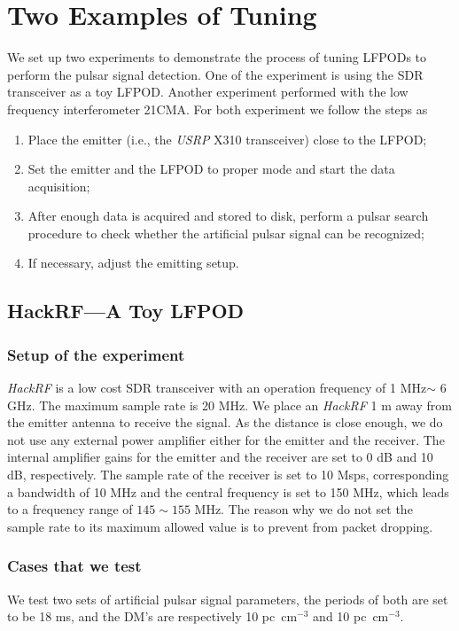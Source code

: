 \documentclass[fleqn,usenatbib]{mnras}
\begin{document}
\section{Two Examples of Tuning}
We set up two experiments to demonstrate the process of tuning LFPODs to perform the pulsar signal detection. 
One of the experiment is using the SDR transceiver as a toy LFPOD.
Another experiment performed with the low frequency interferometer 21CMA.
For both experiment we follow the steps as
\begin{enumerate}
    \item Place the emitter (i.e., the \textit{USRP} X310 transceiver) close to the LFPOD;
    \item Set the emitter and the LFPOD to proper mode and start the data acquisition;
    \item After enough data is acquired and stored to disk, perform a pulsar search procedure to check whether the artificial pulsar signal can be recognized;
    \item If necessary, adjust the emitting setup.
\end{enumerate}

\subsection{HackRF---A Toy LFPOD}
\subsubsection{Setup of the experiment}
\textit{HackRF} is a low cost SDR transceiver with an operation frequency of 1 MHz$\sim$ 6 GHz.
The maximum sample rate is 20 MHz.
We place an \textit{HackRF} 1 m away from the emitter antenna to receive the signal.
As the distance is close enough, we do not use any external power amplifier either for the emitter and the receiver. 
The internal amplifier gains for the emitter and the receiver are set to 0 dB and 10 dB, respectively.
The sample rate of the receiver is set to 10 Msps, corresponding a bandwidth of 10 MHz and the central frequency is set to 150 MHz, which leads to a frequency range of $145\sim 155$ MHz.
The reason why we do not set the sample rate to its maximum allowed value is to prevent from packet dropping.

\subsubsection{Cases that we test}
We test two sets of artificial pulsar signal parameters, the periods of both are set to be 18 ms, and the DM's are respectively 10 pc~cm$^{-3}$ and 10 pc~cm$^{-3}$.
\end{document}

